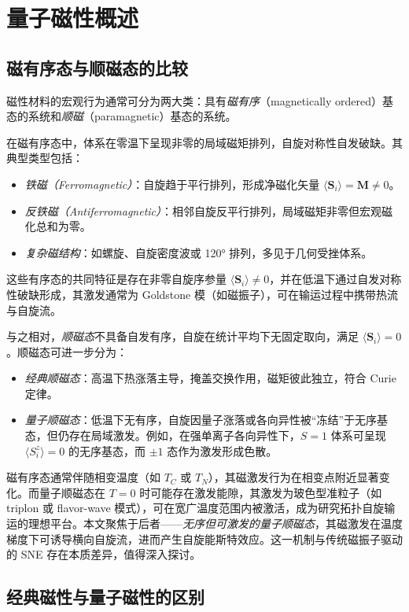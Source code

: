 \section{量子磁性概述}\label{sec:quantum_magnetism}

\subsection{磁有序态与顺磁态的比较}

磁性材料的宏观行为通常可分为两大类：具有\emph{磁有序}（magnetically ordered）基态的系统和\emph{顺磁}（paramagnetic）基态的系统。

在磁有序态中，体系在零温下呈现非零的局域磁矩排列，自旋对称性自发破缺。其典型类型包括：
\begin{itemize}
    \item \emph{铁磁（Ferromagnetic）}：自旋趋于平行排列，形成净磁化矢量 $\langle \mathbf{S}_i \rangle = \mathbf{M} \neq 0$。
    \item \emph{反铁磁（Antiferromagnetic）}：相邻自旋反平行排列，局域磁矩非零但宏观磁化总和为零。
    \item \emph{复杂磁结构}：如螺旋、自旋密度波或 120° 排列，多见于几何受挫体系。
\end{itemize}
这些有序态的共同特征是存在非零自旋序参量 $\langle \mathbf{S}_i \rangle \neq 0$，并在低温下通过自发对称性破缺形成，其激发通常为 Goldstone 模（如磁振子），可在输运过程中携带热流与自旋流。

与之相对，\emph{顺磁态}不具备自发有序，自旋在统计平均下无固定取向，满足 $\langle \mathbf{S}_i \rangle = 0$。顺磁态可进一步分为：
\begin{itemize}
    \item \emph{经典顺磁态}：高温下热涨落主导，掩盖交换作用，磁矩彼此独立，符合 Curie 定律。
    \item \emph{量子顺磁态}：低温下无有序，自旋因量子涨落或各向异性被“冻结”于无序基态，但仍存在局域激发。例如，在强单离子各向异性下，$S=1$ 体系可呈现 $\langle S^z_i \rangle = 0$ 的无序基态，而 $\pm 1$ 态作为激发形成色散。
\end{itemize}
磁有序态通常伴随相变温度（如 $T_C$ 或 $T_N$），其磁激发行为在相变点附近显著变化。而量子顺磁态在 $T=0$ 时可能存在激发能隙，其激发为玻色型准粒子（如 triplon 或 flavor-wave 模式），可在宽广温度范围内被激活，成为研究拓扑自旋输运的理想平台。本文聚焦于后者——\emph{无序但可激发的量子顺磁态}，其磁激发在温度梯度下可诱导横向自旋流，进而产生自旋能斯特效应。这一机制与传统磁振子驱动的 SNE 存在本质差异，值得深入探讨。

\subsection{经典磁性与量子磁性的区别}

